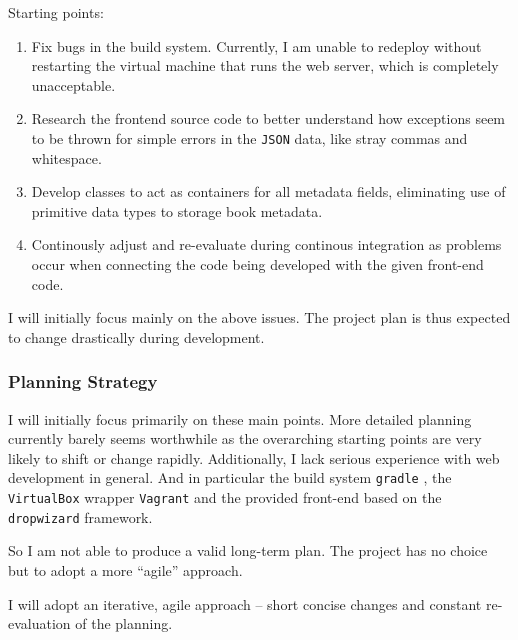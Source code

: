 Starting points:

\begin{enumerate}
  \item Fix bugs in the build system. Currently, I am unable to redeploy
        without restarting the virtual machine that runs the web server, which
        is completely unacceptable.
  \item Research the frontend source code to better understand how exceptions
        seem to be thrown for simple errors in the \texttt{JSON} data, like
        stray commas and whitespace.
  \item Develop classes to act as containers for all metadata fields,
        eliminating use of primitive data types to storage book metadata.
  \item Continously adjust and re-evaluate during continous integration as
        problems occur when connecting the code being developed with the
        given front-end code.
\end{enumerate}

I will initially focus mainly on the above issues. The project plan is thus
expected to change drastically during development.


\subsubsection{Planning Strategy}
I will initially focus primarily on these main points. More detailed planning
currently barely seems worthwhile as the overarching starting points are very
likely to shift or change rapidly.
Additionally, I lack serious experience with web development in general.  And
in particular the build system \texttt{gradle} \cite{tool:gradle}, the
\texttt{VirtualBox} \cite{virtualbox:vdidetails} wrapper \texttt{Vagrant} and
the provided front-end based on the \texttt{dropwizard}
\cite{framework:dropwizard} framework.

So I am not able to produce a valid long-term plan. The project has no choice
but to adopt a more ``agile'' approach.

I will adopt an iterative, agile approach -- short concise changes and constant
re-evaluation of the planning.
